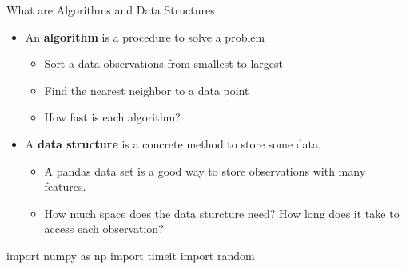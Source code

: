 \documentclass[
  ignorenonframetext,
]{beamer}
\newenvironment{Shaded}{\begin{snugshade}}{\end{snugshade}}
\newcommand{\ImportTok}[1]{\textcolor[rgb]{0.00,0.46,0.62}{#1}}
\newcommand{\NormalTok}[1]{\textcolor[rgb]{0.00,0.23,0.31}{#1}}
\begin{document}
\begin{frame}[fragile]{What are Algorithms and Data Structures}
\protect\hypertarget{what-are-algorithms-and-data-structures}{}
\begin{itemize}
\item
  An \textbf{algorithm} is a procedure to solve a problem

  \begin{itemize}
  \item
    Sort a data observations from smallest to largest
  \item
    Find the nearest neighbor to a data point
  \item
    How fast is each algorithm?
  \end{itemize}
\item
  A \textbf{data structure} is a concrete method to store some data.

  \begin{itemize}
  \item
    A pandas data set is a good way to store observations with many
    features.
  \item
    How much space does the data sturcture need? How long does it take
    to access each observation?
  \end{itemize}
\end{itemize}

\begin{Shaded}
\begin{Highlighting}[]
\ImportTok{import}\NormalTok{ numpy }\ImportTok{as}\NormalTok{ np}
\ImportTok{import}\NormalTok{ timeit}
\ImportTok{import}\NormalTok{ random}
\end{Highlighting}
\end{Shaded}
\end{frame}
\end{document}
